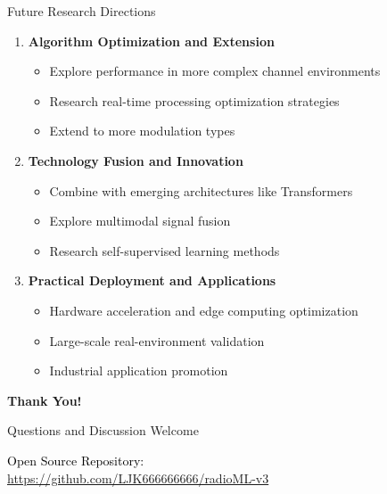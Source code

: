 \documentclass[aspectratio=169]{beamer}
\begin{document}
\begin{frame}{Future Research Directions}
\begin{enumerate}
\item \textbf{Algorithm Optimization and Extension}
\begin{itemize}
\item Explore performance in more complex channel environments
\item Research real-time processing optimization strategies
\item Extend to more modulation types
\end{itemize}

\item \textbf{Technology Fusion and Innovation}
\begin{itemize}
\item Combine with emerging architectures like Transformers
\item Explore multimodal signal fusion
\item Research self-supervised learning methods
\end{itemize}

\item \textbf{Practical Deployment and Applications}
\begin{itemize}
\item Hardware acceleration and edge computing optimization
\item Large-scale real-environment validation
\item Industrial application promotion
\end{itemize}
\end{enumerate}
\end{frame}

\begin{frame}
\centering
\Huge \textcolor{zjutblue}{\textbf{Thank You!}}

\vspace{1cm}
\Large \textcolor{zjutblue}{Questions and Discussion Welcome}

\vspace{1cm}
\normalsize
\textcolor{black}{
Open Source Repository:\\
\url{https://github.com/LJK666666666/radioML-v3}
}
\end{frame}
\end{document}
